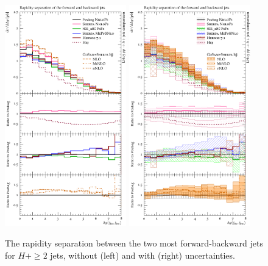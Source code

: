 \begin{figure}[t!]
  \centering
  \includegraphics[width=0.47\textwidth]{figures/hjetscomp_u_jjdy_dy.pdf}
  \hfill
  \includegraphics[width=0.47\textwidth]{figures/hjetscomp_jjdy_dy.pdf}
  \caption{\label{fig:hjetscomp:results:2obs:dyjj_fb}%
    The rapidity separation between the two most forward-backward jets
    for $H+\ge2$ jets, without (left) and with (right) uncertainties.
    }
\end{figure}

